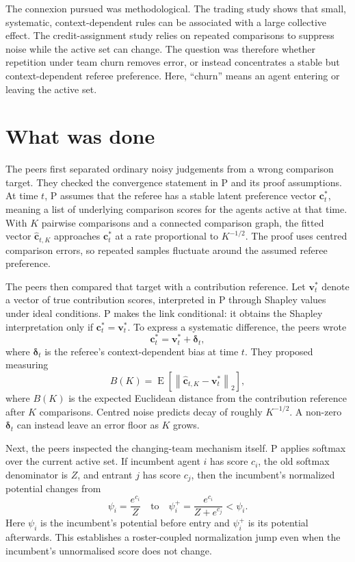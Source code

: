\documentclass{article}
\begin{document}
The connexion pursued was methodological.  The trading study shows that small, systematic, context-dependent rules can be associated with a large collective effect.  The credit-assignment study relies on repeated comparisons to suppress noise while the active set can change.  The question was therefore whether repetition under team churn removes error, or instead concentrates a stable but context-dependent referee preference.  Here, ``churn'' means an agent entering or leaving the active set.

\section{What was done}

The peers first separated ordinary noisy judgements from a wrong comparison target.  They checked the convergence statement in P and its proof assumptions.  At time \(t\), P assumes that the referee has a stable latent preference vector \(\mathbf{c}_t^*\), meaning a list of underlying comparison scores for the agents active at that time.  With \(K\) pairwise comparisons and a connected comparison graph, the fitted vector \(\widehat{\mathbf{c}}_{t,K}\) approaches \(\mathbf{c}_t^*\) at a rate proportional to \(K^{-1/2}\).  The proof uses centred comparison errors, so repeated samples fluctuate around the assumed referee preference.

The peers then compared that target with a contribution reference.  Let \(\mathbf{v}_t^*\) denote a vector of true contribution scores, interpreted in P through Shapley values under ideal conditions.  P makes the link conditional: it obtains the Shapley interpretation only if \(\mathbf{c}_t^*=\mathbf{v}_t^*\).  To express a systematic difference, the peers wrote
\[
\mathbf{c}_t^*=\mathbf{v}_t^*+\boldsymbol{\delta}_t,
\]
where \(\boldsymbol{\delta}_t\) is the referee's context-dependent bias at time \(t\).  They proposed measuring
\[
B(K)=\operatorname{E}\!\left[
\left\lVert\widehat{\mathbf{c}}_{t,K}-\mathbf{v}_t^*\right\rVert_2
\right],
\]
where \(B(K)\) is the expected Euclidean distance from the contribution reference after \(K\) comparisons.  Centred noise predicts decay of roughly \(K^{-1/2}\).  A non-zero \(\boldsymbol{\delta}_t\) can instead leave an error floor as \(K\) grows.

Next, the peers inspected the changing-team mechanism itself.  P applies softmax over the current active set.  If incumbent agent \(i\) has score \(c_i\), the old softmax denominator is \(Z\), and entrant \(j\) has score \(c_j\), then the incumbent's normalized potential changes from
\[
\psi_i=\frac{e^{c_i}}{Z}
\quad\text{to}\quad
\psi_i^+=\frac{e^{c_i}}{Z+e^{c_j}}<\psi_i.
\]
Here \(\psi_i\) is the incumbent's potential before entry and \(\psi_i^+\) is its potential afterwards.  This establishes a roster-coupled normalization jump even when the incumbent's unnormalised score does not change.
\end{document}
